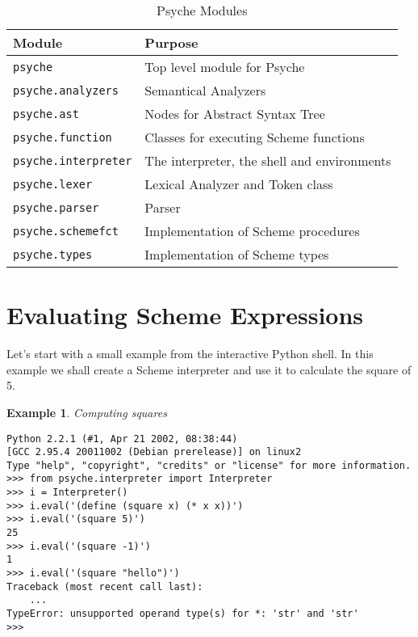 \documentclass{report}
\newcommand{\code}[1]{\texttt{#1}}
\newtheorem{exmp}{Example}[chapter]
\newenvironment{example}[1]
    {\begin{exmp} \textup{#1}
       \begin{small}}
    {  \end{small}
     \end{exmp}}
\begin{document}
\begin{table}
  \begin{center}
    \begin{tabular}{|ll|}
        \hline
        Module                  & Purpose     \\
        \hline
        \code{psyche}           & Top level module for Psyche \\
        \code{psyche.analyzers} & Semantical Analyzers \\
        \code{psyche.ast}       & Nodes for Abstract Syntax Tree \\
        \code{psyche.function}  & Classes for executing Scheme
                                  functions \\
        \code{psyche.interpreter}&The interpreter, the shell and
                                  environments \\
        \code{psyche.lexer}     & Lexical Analyzer and Token class \\
        \code{psyche.parser}    & Parser \\
        \code{psyche.schemefct} & Implementation of Scheme procedures \\
        \code{psyche.types}     & Implementation of Scheme types \\
        \hline
    \end{tabular}
  \end{center}
\caption{Psyche Modules}
\label{table:modules}
\end{table}

\section{Evaluating Scheme Expressions}
Let's start with a small example from the interactive Python shell. In
this example we shall create a Scheme interpreter and use it to
calculate the square of 5.

\begin{example}{Computing squares}
\begin{verbatim} 
Python 2.2.1 (#1, Apr 21 2002, 08:38:44)  
[GCC 2.95.4 20011002 (Debian prerelease)] on linux2 
Type "help", "copyright", "credits" or "license" for more information.
>>> from psyche.interpreter import Interpreter
>>> i = Interpreter()
>>> i.eval('(define (square x) (* x x))')
>>> i.eval('(square 5)')
25
>>> i.eval('(square -1)')
1
>>> i.eval('(square "hello")')
Traceback (most recent call last):
    ...
TypeError: unsupported operand type(s) for *: 'str' and 'str'
>>>
\end{verbatim}
\end{example}
\end{document}

